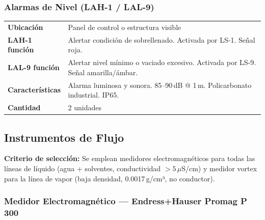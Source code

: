 \documentclass[12pt,letterpaper]{article}
\begin{document}
\subsubsection{Alarmas de Nivel (LAH-1 / LAL-9)}

\begin{especbox}[title={LAH-1 / LAL-9 — Patlite LR6 Signal Tower}]
\renewcommand{\arraystretch}{1.25}
\begin{tabular}{L{4cm} L{9.5cm}}
\textbf{Ubicación}       & Panel de control o estructura visible \\
\textbf{LAH-1 función}   & Alertar condición de sobrellenado. Activada por LS-1. Señal roja. \\
\textbf{LAL-9 función}   & Alertar nivel mínimo o vaciado excesivo. Activada por LS-9. Señal amarilla/ámbar. \\
\textbf{Características} & Alarma luminosa y sonora. 85--90\,dB @ 1\,m. Policarbonato industrial. IP65. \\
\textbf{Cantidad}        & 2 unidades \\
\end{tabular}
\end{especbox}

\subsection{Instrumentos de Flujo}

\begin{notabox}
\textbf{Criterio de selección:} Se emplean medidores electromagnéticos para todas las líneas de líquido (agua + solventes, conductividad $>5\,\mu$S/cm) y medidor vortex para la línea de vapor (baja densidad, 0.0017\,g/cm³, no conductor).
\end{notabox}

\subsubsection{Medidor Electromagnético — Endress+Hauser Promag P 300}
\end{document}
